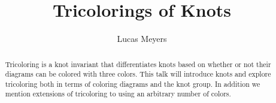 \documentclass[12pt]{amsart}
\begin{document}
\title{Tricolorings of Knots}

\author{Lucas Meyers}

\address{Mathematics Department\\Louisiana State University\\Baton Rouge, Louisiana}


\begin{abstract}
  Tricoloring is a knot invariant that differentiates knots based on
  whether or not their diagrams can be colored with three colors.
  This talk will introduce knots and explore tricoloring both in terms of
  coloring diagrams and the knot group. In addition we mention extensions of
  tricoloring to using an arbitrary number of colors.
\end{abstract}

\maketitle
\end{document}
